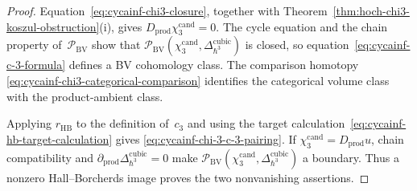 \begin{proof}
Equation~\eqref{eq:cycainf-chi3-closure}, together with
Theorem~\ref{thm:hoch-chi3-koszul-obstruction}(i), gives
$D_{\mathrm{prod}}\chi_3^{\mathrm{cand}}=0$. The cycle equation and
the chain property of~$\mathcal P_{\mathrm{BV}}$ show that
$\mathcal P_{\mathrm{BV}}(\chi_3^{\mathrm{cand}},
\Delta^{\mathrm{cubic}}_{\hbar^3})$ is closed, so
equation~\eqref{eq:cycainf-c-3-formula} defines a BV cohomology class.
The comparison homotopy
\eqref{eq:cycainf-chi3-categorical-comparison} identifies the
categorical volume class with the product-ambient class.

Applying $r_{\mathrm{HB}}$ to the definition of~$c_3$ and using the
target calculation~\eqref{eq:cycainf-hb-target-calculation} gives
\eqref{eq:cycainf-chi-3-c-3-pairing}. If
$\chi_3^{\mathrm{cand}}=D_{\mathrm{prod}}u$, chain compatibility and
$\partial_{\mathrm{prod}}\Delta^{\mathrm{cubic}}_{\hbar^3}=0$ make
$\mathcal P_{\mathrm{BV}}(\chi_3^{\mathrm{cand}},
\Delta^{\mathrm{cubic}}_{\hbar^3})$ a boundary. Thus a nonzero
Hall--Borcherds image proves the two nonvanishing assertions.
\end{proof}

